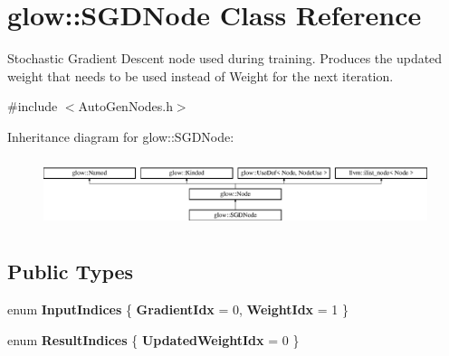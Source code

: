 \hypertarget{classglow_1_1_s_g_d_node}{}\section{glow\+:\+:S\+G\+D\+Node Class Reference}
\label{classglow_1_1_s_g_d_node}


Stochastic Gradient Descent node used during training. Produces the updated weight that needs to be used instead of Weight for the next iteration.  




{\ttfamily \#include $<$Auto\+Gen\+Nodes.\+h$>$}

Inheritance diagram for glow\+:\+:S\+G\+D\+Node\+:\begin{figure}[H]
\begin{center}
\leavevmode
\includegraphics[height=2.028986cm]{classglow_1_1_s_g_d_node}
\end{center}
\end{figure}
\subsection*{Public Types}
\begin{DoxyCompactItemize}
\item 
\mbox{\label{classglow_1_1_s_g_d_node_a9bdae92e60c5c3cf8710ac3f171e66be}} 
enum {\bfseries Input\+Indices} \{ {\bfseries Gradient\+Idx} = 0, 
{\bfseries Weight\+Idx} = 1
 \}
\item 
\mbox{\label{classglow_1_1_s_g_d_node_ae10f5c40b10d58a74134e34cc0835eea}} 
enum {\bfseries Result\+Indices} \{ {\bfseries Updated\+Weight\+Idx} = 0
 \}
\end{DoxyCompactItemize}
